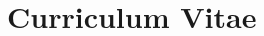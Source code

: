 \documentclass[12pt,twoside]{report}
\begin{document}

\begin{spacing}{2}


%


%



\end{spacing}

{}
\begin{appendices}



\end{appendices}

\chapter*{Curriculum Vitae}
\end{document}

